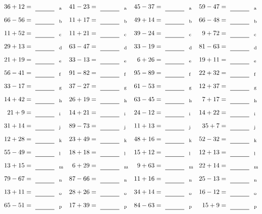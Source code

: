 \documentclass
[
  draft    = true,
  fontsize = 11pt,
  parskip  = half-
]
{scrartcl}
\begin{document}
\clearpage
\begin{align*}
    \pline{36+12}&=\rline{a}
  & \pline{41-23}&=\rline{a}
  & \pline{45-37}&=\rline{a}
  & \pline{59-47}&=\rline{a} \\[1ex]
    \pline{66-56}&=\rline{b}
  & \pline{11+17}&=\rline{b}
  & \pline{49+14}&=\rline{b}
  & \pline{66-48}&=\rline{b} \\[1ex]
    \pline{11+52}&=\rline{c}
  & \pline{11+21}&=\rline{c}
  & \pline{39-24}&=\rline{c}
  & \pline{9+72}&=\rline{c} \\[1ex]
    \pline{29+13}&=\rline{d}
  & \pline{63-47}&=\rline{d}
  & \pline{33-19}&=\rline{d}
  & \pline{81-63}&=\rline{d} \\[1ex]
    \pline{21+19}&=\rline{e}
  & \pline{33-13}&=\rline{e}
  & \pline{6+26}&=\rline{e}
  & \pline{19+11}&=\rline{e} \\[1ex]
    \pline{56-41}&=\rline{f}
  & \pline{91-82}&=\rline{f}
  & \pline{95-89}&=\rline{f}
  & \pline{22+32}&=\rline{f} \\[1ex]
    \pline{33-17}&=\rline{g}
  & \pline{37-27}&=\rline{g}
  & \pline{61-53}&=\rline{g}
  & \pline{12+37}&=\rline{g} \\[1ex]
    \pline{14+42}&=\rline{h}
  & \pline{26+19}&=\rline{h}
  & \pline{63-45}&=\rline{h}
  & \pline{7+17}&=\rline{h} \\[1ex]
    \pline{21+9}&=\rline{i}
  & \pline{14+21}&=\rline{i}
  & \pline{24-12}&=\rline{i}
  & \pline{14+22}&=\rline{i} \\[1ex]
    \pline{31+14}&=\rline{j}
  & \pline{89-73}&=\rline{j}
  & \pline{11+13}&=\rline{j}
  & \pline{35+7}&=\rline{j} \\[1ex]
    \pline{12+28}&=\rline{k}
  & \pline{23+49}&=\rline{k}
  & \pline{48+16}&=\rline{k}
  & \pline{52-32}&=\rline{k} \\[1ex]
    \pline{55-49}&=\rline{l}
  & \pline{18+18}&=\rline{l}
  & \pline{15+12}&=\rline{l}
  & \pline{12+13}&=\rline{l} \\[1ex]
    \pline{13+15}&=\rline{m}
  & \pline{6+29}&=\rline{m}
  & \pline{9+63}&=\rline{m}
  & \pline{22+14}&=\rline{m} \\[1ex]
    \pline{79-67}&=\rline{n}
  & \pline{87-66}&=\rline{n}
  & \pline{11+16}&=\rline{n}
  & \pline{25-13}&=\rline{n} \\[1ex]
    \pline{13+11}&=\rline{o}
  & \pline{28+26}&=\rline{o}
  & \pline{34+14}&=\rline{o}
  & \pline{16-12}&=\rline{o} \\[1ex]
    \pline{65-51}&=\rline{p}
  & \pline{17+39}&=\rline{p}
  & \pline{84-63}&=\rline{p}
  & \pline{15+9}&=\rline{p}
\end{align*}
\end{document}

